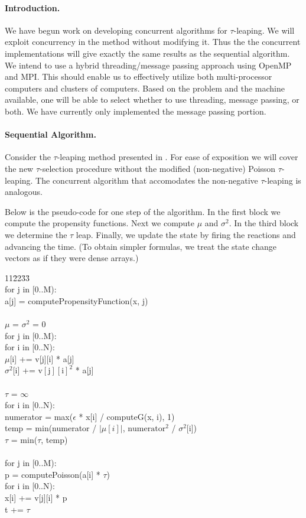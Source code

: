 \documentclass{article}
\begin{document}
\paragraph{Introduction.}
We have begun work on developing concurrent algorithms for
$\tau$-leaping.  We will exploit concurrency in the method without
modifying it.  Thus the the concurrent implementations will give
exactly the same results as the sequential algorithm.  We intend to
use a hybrid threading/message passing approach using OpenMP and MPI.
This should enable us to effectively utilize both multi-processor
computers and clusters of computers.  Based on the problem and the
machine available, one will be able to select whether to use
threading, message passing, or both.  We have currently only
implemented the message passing portion.


\paragraph{Sequential Algorithm.}
Consider the $\tau$-leaping method presented in \cite{cao2006}.
For ease of exposition we will cover the new 
$\tau$-selection procedure without the modified
(non-negative) Poisson $\tau$-leaping.  The concurrent algorithm 
that accomodates the non-negative $\tau$-leaping is analogous.

Below is the pseudo-code for one step of the algorithm.  In the first block
we compute the propensity functions.  Next we compute $\mu$ and 
$\sigma^2$.  In the third block we determine the $\tau$ leap.
Finally, we update the state by firing the reactions and advancing the time.
(To obtain simpler formulas, we treat the state change vectors as if they
were dense arrays.)

\begin{tabbing}
11\=22\=33\=\kill\\
for j in [0..M):\\
\>a[j] = computePropensityFunction(x, j)\\
\\
$\mu$ = $\sigma^2$ = 0\\
for j in [0..M):\\
\>for i in [0..N):\\
\>\>$\mu$[i] += v[j][i] * a[j]\\
\>\>$\sigma^2$[i] += $\mathrm{v[j][i]}^2$ * a[j]\\
\\
$\tau$ = $\infty$\\
for i in [0..N):\\
\>numerator = max($\epsilon$ * x[i] / computeG(x, i), 1)\\
\>temp = min(numerator / $|\mu[i]|$, $\mathrm{numerator}^2$ / $\sigma^2$[i])\\
\>$\tau$ = min($\tau$, temp)\\
\\
for j in [0..M):\\
\>p = computePoisson(a[i] * $\tau$)\\
\>for i in [0..N):\\
\>\>x[i] += v[j][i] * p\\
t += $\tau$
\end{tabbing}
\end{document}
